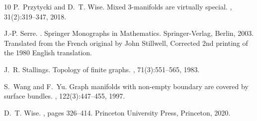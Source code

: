 \documentclass[12pt, a4paper]{amsart}
\theoremstyle{definition}
\begin{document}
\begin{thebibliography}{10}
P.~Przytycki and D.~T. Wise.
\newblock Mixed 3-manifolds are virtually special.
, 31(2):319--347, 2018.

J.-P. Serre.
.
\newblock Springer Monographs in Mathematics. Springer-Verlag, Berlin, 2003.
\newblock Translated from the French original by John Stillwell, Corrected 2nd
  printing of the 1980 English translation.

J.~R. Stallings.
\newblock Topology of finite graphs.
, 71(3):551--565, 1983.

S.~Wang and F.~Yu.
\newblock Graph manifolds with non-empty boundary are covered by surface
  bundles.
, 122(3):447--455, 1997.

D.~T. Wise.
, pages 326--414.
\newblock Princeton University Press, Princeton, 2020.

\end{thebibliography}

%
%
\end{document}
